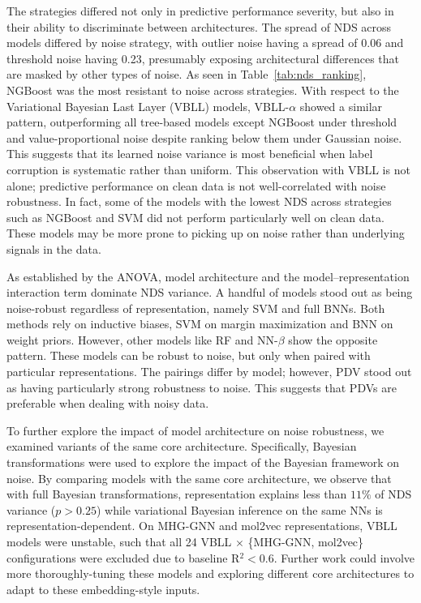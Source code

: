 \documentclass[pdflatex,sn-basic]{sn-jnl}%
\theoremstyle{thmstyleone}%
\theoremstyle{thmstyletwo}%
\theoremstyle{thmstylethree}%
\begin{document}
The strategies differed not only in predictive performance severity, but also in their ability to discriminate between architectures. The spread of NDS across models differed by noise strategy, with outlier noise having a spread of 0.06 and threshold noise having 0.23, presumably exposing architectural differences that are masked by other types of noise. As seen in Table~\ref{tab:nds_ranking}, NGBoost was the most resistant to noise across strategies. With respect to the Variational Bayesian Last Layer (VBLL) models, VBLL-$\alpha$ showed a similar pattern, outperforming all tree-based models except NGBoost under threshold and value-proportional noise despite ranking below them under Gaussian noise. This suggests that its learned noise variance is most beneficial when label corruption is systematic rather than uniform. This observation with VBLL is not alone; predictive performance on clean data is not well-correlated with noise robustness. In fact, some of the models with the lowest NDS across strategies such as NGBoost and SVM did not perform particularly well on clean data. These models may be more prone to picking up on noise rather than underlying signals in the data. 

As established by the ANOVA, model architecture and the model--representation interaction term dominate NDS variance. A handful of models stood out as being noise-robust regardless of representation, namely SVM and full BNNs. Both methods rely on inductive biases, SVM on margin maximization and BNN on weight priors. However, other models like RF and NN-$\beta$ show the opposite pattern. These models can be robust to noise, but only when paired with particular representations. The pairings differ by model; however, PDV stood out as having particularly strong robustness to noise. This suggests that PDVs are preferable when dealing with noisy data. 

To further explore the impact of model architecture on noise robustness, we examined variants of the same core architecture. Specifically, Bayesian transformations were used to explore the impact of the Bayesian framework on noise. By comparing models with the same core architecture, we observe that with full Bayesian transformations, representation explains less than $11\%$ of NDS variance ($p > 0.25$) while variational Bayesian inference on the same NNs is representation-dependent. On MHG-GNN and mol2vec representations, VBLL models were unstable, such that all 24 VBLL $\times$ \{MHG-GNN, mol2vec\} configurations were excluded due to baseline R$^2 < 0.6$. Further work could involve more thoroughly-tuning these models and exploring different core architectures to adapt to these embedding-style inputs. 
\end{document}
